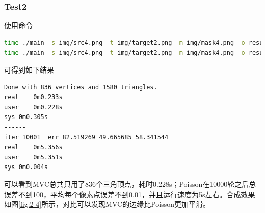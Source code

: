 \documentclass[a4paper]{article}
\begin{document}
\subsubsection{Test2}
使用命令
\begin{lstlisting}[language=bash]
time ./main -s img/src4.png -t img/target2.png -m img/mask4.png -o result_MVC.png -h 142 -w 132 -a MVC
time ./main -s img/src4.png -t img/target2.png -m img/mask4.png -o result_Poisson.png -i 10000 -h 150 -w 150 -a Poisson
\end{lstlisting}
可得到如下结果
\begin{lstlisting}[language=bash]
Done with 836 vertices and 1580 triangles.
real	0m0.233s
user	0m0.228s
sys	0m0.305s
------
iter 10001  err 82.519269 49.665685 58.341544
real	0m5.356s
user	0m5.351s
sys	0m0.004s
\end{lstlisting}

可以看到MVC总共只用了836个三角顶点，耗时0.228s；Poisson在10000轮之后总误差不到100，平均每个像素点误差不到0.01，并且运行速度为5s左右。合成效果如图\ref{fig:2-4}所示，对比可以发现MVC的边缘比Poisson更加平滑。
\end{document}
